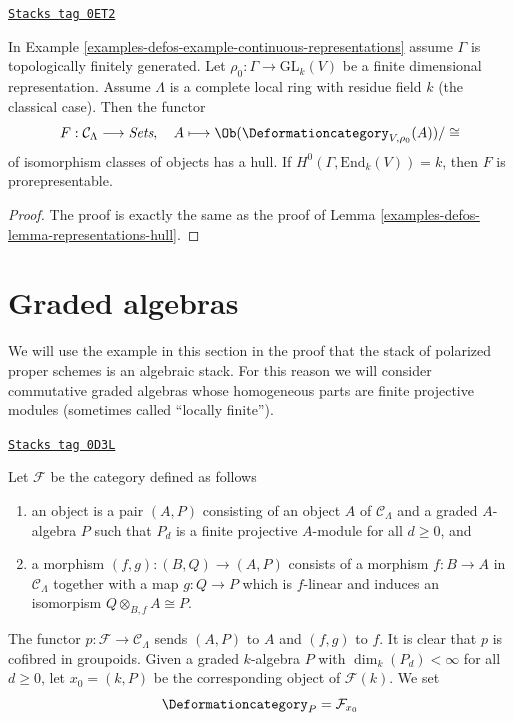 \begin{lemma}
\label{examples-defos-lemma-continuous-representations-hull}
\href{https://stacks.math.columbia.edu/tag/0ET2}{\texttt{Stacks tag 0ET2}}

In Example \ref{examples-defos-example-continuous-representations} assume $\Gamma$
is topologically finitely generated.
Let $\rho_0 : \Gamma \to \text{GL}_k(V)$ be a finite dimensional representation.
Assume $\Lambda$ is a complete local ring with residue field $k$
(the classical case). Then the functor
$$
F : \mathcal{C}_\Lambda \longrightarrow \textit{Sets},\quad
A \longmapsto \Ob(\Deformationcategory_{V, \rho_0}(A))/\cong
$$
of isomorphism classes of objects has a hull. If
$H^0(\Gamma, \text{End}_k(V)) = k$, then $F$ is
prorepresentable.
\end{lemma}

\begin{proof}
The proof is exactly the same as the proof of
Lemma \ref{examples-defos-lemma-representations-hull}.
\end{proof}

\section{Graded algebras}
\label{examples-defos-section-graded-algebras}
We will use the example in this section in the proof that the stack of
polarized proper schemes is an algebraic stack. For this reason we will
consider commutative graded algebras whose homogeneous parts are
finite projective modules (sometimes called ``locally finite'').

\begin{example}

\label{examples-defos-example-graded-algebras}
\href{https://stacks.math.columbia.edu/tag/0D3L}{\texttt{Stacks tag 0D3L}}

Let $\mathcal{F}$ be the category defined as follows
\begin{enumerate}
\item an object is a pair $(A, P)$ consisting of an
object $A$ of $\mathcal{C}_\Lambda$ and a graded $A$-algebra $P$
such that $P_d$ is a finite projective $A$-module for all $d \geq 0$, and
\item a morphism $(f, g) : (B, Q) \to (A, P)$ consists of
a morphism $f : B \to A$ in $\mathcal{C}_\Lambda$ together
with a map $g : Q \to P$ which is $f$-linear and induces an
isomorpism $Q \otimes_{B, f} A \cong P$.
\end{enumerate}
The functor $p : \mathcal{F} \to \mathcal{C}_\Lambda$ sends $(A, P)$
to $A$ and $(f, g)$ to $f$. It is clear that $p$ is cofibred in groupoids.
Given a graded $k$-algebra $P$ with $\dim_k(P_d) < \infty$ for all
$d \geq 0$, let $x_0 = (k, P)$ be the corresponding object of $\mathcal{F}(k)$.
We set
$$
\Deformationcategory_P = \mathcal{F}_{x_0}
$$
\end{example}

